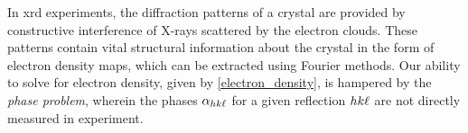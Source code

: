 


In \ac{xrd} experiments, the diffraction patterns of a crystal are provided by constructive interference of X-rays scattered by the electron clouds. These patterns contain vital structural information about the crystal in the form of electron density maps, which can be extracted using Fourier methods. Our ability to solve for electron density, given by \cref{electron_density}, is hampered by the \textit{phase problem}, wherein the phases $\alpha_{hk\ell}$ for a given reflection $hk\ell$ are not directly measured in experiment. 




